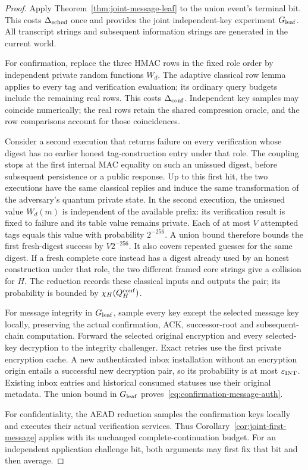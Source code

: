 \documentclass[pdflatex]{sn-jnl}
\theoremstyle{thmstyleone}
\theoremstyle{thmstylethree}
\theoremstyle{thmstyletwo}
\begin{document}
\begin{proof}
Apply Theorem~\ref{thm:joint-message-leaf} to the union event's terminal
bit. This costs $\Delta_{\rm sched}$ once and provides the joint
independent-key experiment $G_{\rm leaf}$. All transcript strings and
subsequent information strings are generated in the current world.

For confirmation, replace the three HMAC rows in the fixed role order by
independent private random functions $W_d$. The adaptive classical row
lemma applies to every tag and verification evaluation; its ordinary
query budgets include the remaining real rows. This costs
$\Delta_{\rm conf}$. Independent key samples may coincide numerically;
the real rows retain the shared compression oracle, and the row
comparisons account for those coincidences.

Consider a second execution that returns failure on every verification
whose digest has no earlier honest tag-construction entry under that
role. The coupling stops at the first internal MAC equality on such an
unissued digest, before subsequent persistence or a public response.
Up to this first hit, the two executions have
the same classical replies and induce the same transformation of the
adversary's quantum private state. In the second execution, the unissued
value $W_d(m)$ is independent of the available prefix: its verification
result is fixed to failure and its table value remains private. Each
of at most $V$ attempted tags equals this value with probability
$2^{-256}$. A union bound therefore bounds the first fresh-digest
success by $V2^{-256}$. It also covers repeated guesses for the same
digest. If a fresh complete core instead has a digest already used by
an honest construction under that role, the two different framed core
strings give a collision for $H$. The reduction records these classical
inputs and outputs the pair; its probability is bounded by
$\chi_H(Q_H^{\rm conf})$.

For message integrity in $G_{\rm leaf}$, sample every key except the
selected message key locally, preserving the actual confirmation, ACK,
successor-root and subsequent-chain computation. Forward the selected
original encryption and every selected-key decryption to the integrity
challenger. Exact retries use the first private encryption cache. A new
authenticated inbox installation without an encryption origin entails a
successful new decryption pair, so its probability is at most
$\varepsilon_{\rm INT}$. Existing inbox entries and historical consumed
statuses use their original metadata. The union bound in
$G_{\rm leaf}$ proves~\eqref{eq:confirmation-message-auth}.

For confidentiality, the AEAD reduction samples the confirmation keys
locally and executes their actual verification services. Thus
Corollary~\ref{cor:joint-first-message} applies with its unchanged
complete-continuation budget. For an independent application challenge
bit, both arguments may first fix that bit and then average.
\end{proof}
\end{document}
